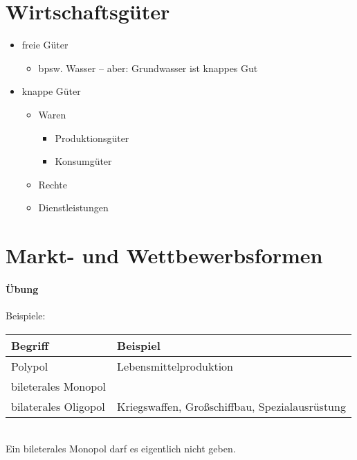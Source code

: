 \documentclass{scrreprt}
\begin{document}
\section{Wirtschaftsgüter}
\begin{itemize}
\item freie Güter
\begin{itemize}
\item bpsw. Wasser -- aber: Grundwasser ist knappes Gut
\end{itemize}
\item knappe Güter
\begin{itemize}
\item Waren
\begin{itemize}
\item Produktionsgüter
\item Konsumgüter
\end{itemize}
\item Rechte
\item Dienstleistungen
\end{itemize}
\end{itemize}

\section{Markt- und Wettbewerbsformen}
\paragraph{Übung} Beispiele:\\
\begin{tabular}{l l}
Begriff & Beispiel\\
\hline
Polypol & Lebensmittelproduktion\\
bileterales Monopol & \\
bilaterales Oligopol & Kriegswaffen, Großschiffbau, Spezialausrüstung
\end{tabular}\\
Ein bileterales Monopol darf es eigentlich nicht geben.
\end{document}
